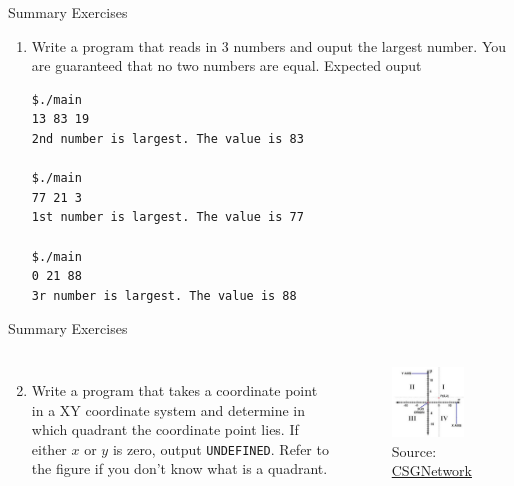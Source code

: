 \documentclass[10pt,xcolor={table,dvipsnames},t]{beamer}
\begin{document}
\begin{frame}[fragile]{Summary Exercises}
  \begin{enumerate}
    \item Write a program that reads in 3 numbers and ouput the largest number. You are guaranteed that no two numbers are equal. Expected ouput
\begin{lstlisting}[language=bash]
$./main
13 83 19
2nd number is largest. The value is 83

$./main
77 21 3
1st number is largest. The value is 77

$./main
0 21 88
3r number is largest. The value is 88
\end{lstlisting}
  \end{enumerate}
\end{frame}


\begin{frame}[fragile]{Summary Exercises}
    \begin{columns}
      \begin{enumerate}
        \setcounter{enumi}{1}
        \item Write a program that takes a coordinate point in a XY coordinate system and determine in which quadrant the coordinate point lies. If either $x$ or $y$ is zero, output \texttt{UNDEFINED}. Refer to the figure if you don't know what is a quadrant.
      \end{enumerate}
      \begin{figure}
        \includegraphics[width=0.9\textwidth]{img/quadrant.jpg}
        \caption*{Source: \href{http://www.csgnetwork.com/coordinatedistancecalc.html}{CSGNetwork}}
      \end{figure}
    \end{columns}
\end{frame}
\end{document}
